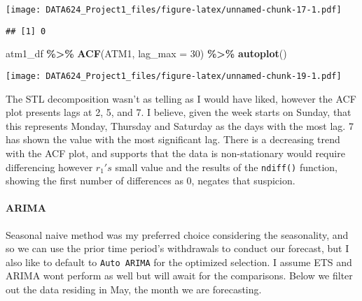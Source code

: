 \documentclass[
]{article}
\newenvironment{Shaded}{\begin{snugshade}}{\end{snugshade}}
\newcommand{\AttributeTok}[1]{\textcolor[rgb]{0.13,0.29,0.53}{#1}}
\newcommand{\DecValTok}[1]{\textcolor[rgb]{0.00,0.00,0.81}{#1}}
\newcommand{\FunctionTok}[1]{\textcolor[rgb]{0.13,0.29,0.53}{\textbf{#1}}}
\newcommand{\NormalTok}[1]{#1}
\newcommand{\SpecialCharTok}[1]{\textcolor[rgb]{0.81,0.36,0.00}{\textbf{#1}}}
\begin{document}
\texttt{[image: DATA624\_Project1\_files/figure-latex/unnamed-chunk-17-1.pdf]}

\begin{Shaded}
\end{Shaded}

\begin{verbatim}
## [1] 0
\end{verbatim}

\begin{Shaded}
\begin{Highlighting}[]
\NormalTok{atm1\_df }\SpecialCharTok{\%\textgreater{}\%} 
  \FunctionTok{ACF}\NormalTok{(ATM1, }\AttributeTok{lag\_max =} \DecValTok{30}\NormalTok{) }\SpecialCharTok{\%\textgreater{}\%} 
  \FunctionTok{autoplot}\NormalTok{()}
\end{Highlighting}
\end{Shaded}

\texttt{[image: DATA624\_Project1\_files/figure-latex/unnamed-chunk-19-1.pdf]}

The STL decomposition wasn't as telling as I would have liked, however
the ACF plot presents lags at 2, 5, and 7. I believe, given the week
starts on Sunday, that this represents Monday, Thursday and Saturday as
the days with the most lag. 7 has shown the value with the most
significant lag. There is a decreasing trend with the ACF plot, and
supports that the data is non-stationary would require differencing
however \(r_ 1's\) small value and the results of the \texttt{ndiff()}
function, showing the first number of differences as 0, negates that
suspicion.

\hypertarget{arima}{%
\paragraph{ARIMA}\label{arima}}

Seasonal naive method was my preferred choice considering the
seasonality, and so we can use the prior time period's withdrawals to
conduct our forecast, but I also like to default to \texttt{Auto\ ARIMA}
for the optimized selection. I assume ETS and ARIMA wont perform as well
but will await for the comparisons. Below we filter out the data
residing in May, the month we are forecasting.
\end{document}
